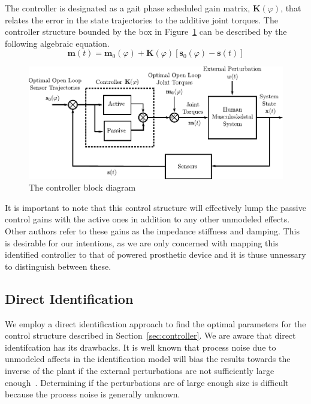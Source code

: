 \documentclass{article}
\newcommand{\K}{\mathbf{K}(\varphi)}
\begin{document}
The controller is designated as a gait phase scheduled gain matrix, $\K$, that
relates the error in the state trajectories to the additive joint torques. The
controller structure bounded by the box in Figure~\ref{fig:controller} can be
described by the following algebraic equation.
%
\begin{equation}
  \mathbf{m}(t) = \mathbf{m}_0(\varphi) + \mathbf{K}(\varphi) [\mathbf{s}_0(\varphi) - \mathbf{s}(t)]
  \label{eq:controller}
\end{equation}
%
\begin{figure}
  \centering
  \includegraphics{figures/control-system.pdf}
  \caption{The controller block diagram}
  \label{fig:controller}
\end{figure}

It is important to note that this control structure will effectively lump the
passive control gains with the active ones in addition to any other unmodeled
effects. Other authors refer to these gains as the impedance stiffness and
damping. This is desirable for our intentions, as we are only concerned with
mapping this identified controller to that of powered prosthetic device and it
is thuse unnessary to distinguish between these.

\subsection*{Direct Identification}
%
We employ a direct identification approach to find the optimal parameters for
the control structure described in Section~\ref{sec:controller}. We are aware
that direct identifcation has its drawbacks. It is well known that process
noise due to unmodeled affects in the identification model will bias the
results towards the inverse of the plant if the external perturbations are not
sufficiently large enough~\cite{Ljung1999,Kearney1990,Kooij2005}. Determining
if the perturbations are of large enough size is difficult because the process
noise is generally unknown.
\end{document}
